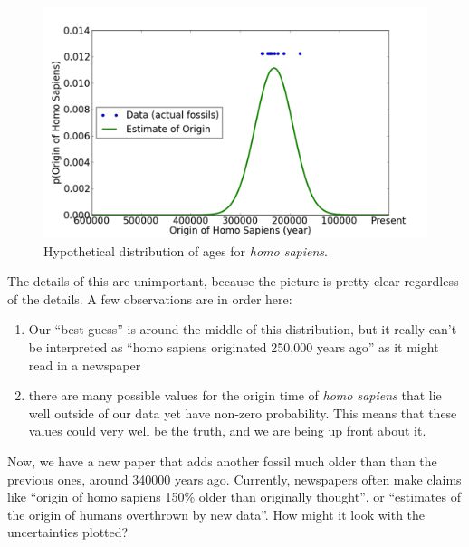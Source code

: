 \begin{figure}[htbp]
\centering
\includegraphics{img/blah2-2011-01-29-11-35.png}
\caption{Hypothetical distribution of ages for {\em homo sapiens}.}
\end{figure}

The details of this are unimportant, because the picture is pretty clear regardless of the details.  A few observations are in order here:

\begin{enumerate}
\def\labelenumi{\arabic{enumi}.}
\itemsep1pt\parskip0pt
\item
  Our ``best guess'' is around the middle of this distribution, but it
  really can't be interpreted as ``homo sapiens originated 250,000 years
  ago'' as it might read in a newspaper
\item
  there are many possible values for the origin time of {\em homo sapiens} that lie well outside of our data yet have non-zero probability.  This means that these values could very well be the truth, and we are being up front about it.
\end{enumerate}

Now, we have a new paper that adds another fossil much older than than
the previous ones, around 340000 years ago. Currently, newspapers often make claims like ``origin of homo sapiens 150\% older than originally thought'', or ``estimates of the origin of humans overthrown by new data''. How might it look with the uncertainties plotted?

